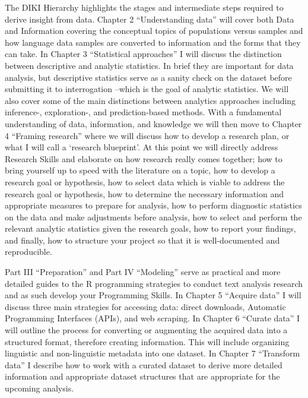 \documentclass[
]{article}
\begin{document}
The DIKI Hierarchy highlights the stages and intermediate steps required to derive insight from data. Chapter 2 ``Understanding data'' will cover both Data and Information covering the conceptual topics of populations versus samples and how language data samples are converted to information and the forms that they can take. In Chapter 3 ``Statistical approaches'' I will discuss the distinction between descriptive and analytic statistics. In brief they are important for data analysis, but descriptive statistics serve as a sanity check on the dataset before submitting it to interrogation --which is the goal of analytic statistics. We will also cover some of the main distinctions between analytics approaches including inference-, exploration-, and prediction-based methods. With a fundamental understanding of data, information, and knowledge we will then move to Chapter 4 ``Framing research'' where we will discuss how to develop a research plan, or what I will call a `research blueprint'. At this point we will directly address Research Skills and elaborate on how research really comes together; how to bring yourself up to speed with the literature on a topic, how to develop a research goal or hypothesis, how to select data which is viable to address the research goal or hypothesis, how to determine the necessary information and appropriate measures to prepare for analysis, how to perform diagnostic statistics on the data and make adjustments before analysis, how to select and perform the relevant analytic statistics given the research goals, how to report your findings, and finally, how to structure your project so that it is well-documented and reproducible.

Part III ``Preparation'' and Part IV ``Modeling'' serve as practical and more detailed guides to the R programming strategies to conduct text analysis research and as such develop your Programming Skills. In Chapter 5 ``Acquire data'' I will discuss three main strategies for accessing data: direct downloads, Automatic Programming Interfaces (APIs), and web scraping. In Chapter 6 ``Curate data'' I will outline the process for converting or augmenting the acquired data into a structured format, therefore creating information. This will include organizing linguistic and non-linguistic metadata into one dataset. In Chapter 7 ``Transform data'' I describe how to work with a curated dataset to derive more detailed information and appropriate dataset structures that are appropriate for the upcoming analysis.
\end{document}
